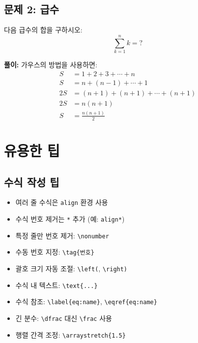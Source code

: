\documentclass[12pt,a4paper]{article}
\begin{document}
\subsection{문제 2: 급수}
다음 급수의 합을 구하시오:
\[
    \sum_{k=1}^{n} k = ?
\]

\textbf{풀이:}
가우스의 방법을 사용하면:
\begin{align*}
    S &= 1 + 2 + 3 + \cdots + n \\
    S &= n + (n-1) + \cdots + 1 \\
    2S &= (n+1) + (n+1) + \cdots + (n+1) \\
    2S &= n(n+1) \\
    S &= \frac{n(n+1)}{2}
\end{align*}

\section{유용한 팁}

\subsection{수식 작성 팁}
\begin{itemize}
    \item 여러 줄 수식은 \texttt{align} 환경 사용
    \item 수식 번호 제거는 \texttt{*} 추가 (예: \texttt{align*})
    \item 특정 줄만 번호 제거: \texttt{\textbackslash nonumber}
    \item 수동 번호 지정: \texttt{\textbackslash tag\{번호\}}
    \item 괄호 크기 자동 조절: \texttt{\textbackslash left(}, \texttt{\textbackslash right)}
    \item 수식 내 텍스트: \texttt{\textbackslash text\{...\}}
    \item 수식 참조: \texttt{\textbackslash label\{eq:name\}}, \texttt{\textbackslash eqref\{eq:name\}}
    \item 긴 분수: \texttt{\textbackslash dfrac} 대신 \texttt{\textbackslash frac} 사용
    \item 행렬 간격 조정: \texttt{\textbackslash arraystretch\{1.5\}}
\end{itemize}
\end{document}
